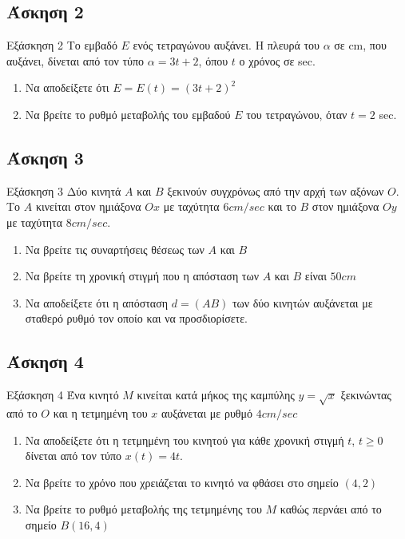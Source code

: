 \documentclass[greek]{beamer}
\begin{document}
\subsection{Άσκηση 2}
\begin{frame}[label=Άσκηση2]{Εξάσκηση 2}
 Το εμβαδό $Ε$ ενός τετραγώνου αυξάνει. Η πλευρά του $α$ σε cm, που αυξάνει, δίνεται από τον τύπο $α=3t+2$, όπου $t$ ο χρόνος σε sec.
 \begin{enumerate}
  \item<1-> Να αποδείξετε ότι $Ε=Ε(t)=(3t+2)^2$
  \item<2-> Να βρείτε το ρυθμό μεταβολής του εμβαδού $Ε$ του τετραγώνου, όταν $t=2$ sec.
 \end{enumerate}

\end{frame}

\subsection{Άσκηση 3}
\begin{frame}[label=Άσκηση3]{Εξάσκηση 3}
 Δύο κινητά $Α$ και $Β$ ξεκινούν συγχρόνως από την αρχή των αξόνων $Ο$. Το $Α$ κινείται στον ημιάξονα $Οx$ με ταχύτητα $6cm/sec$ και το $Β$ στον ημιάξονα $Οy$ με ταχύτητα $8cm/sec$.
 \begin{enumerate}
  \item<1-> Να βρείτε τις συναρτήσεις θέσεως των $Α$ και $Β$
  \item<2-> Να βρείτε τη χρονική στιγμή που η απόσταση των $Α$ και $Β$ είναι $50cm$
  \item<3-> Να αποδείξετε ότι η απόσταση $d=(ΑΒ)$ των δύο κινητών αυξάνεται με σταθερό ρυθμό τον οποίο και να προσδιορίσετε.
 \end{enumerate}

\end{frame}

\subsection{Άσκηση 4}
\begin{frame}[label=Άσκηση4]{Εξάσκηση 4}
 Ένα κινητό $Μ$ κινείται κατά μήκος της καμπύλης $y=\sqrt{x}$ ξεκινώντας από το $Ο$ και η τετμημένη του $x$ αυξάνεται με ρυθμό $4cm/sec$
 \begin{enumerate}
  \item<1-> Να αποδείξετε ότι η τετμημένη του κινητού για κάθε χρονική στιγμή $t$, $t\ge 0$ δίνεται από τον τύπο $x(t)=4t$.
  \item<2-> Να βρείτε το χρόνο που χρειάζεται το κινητό να φθάσει στο σημείο $(4,2)$
  \item<3-> Να βρείτε το ρυθμό μεταβολής της τετμημένης του $Μ$ καθώς περνάει από το σημείο $Β(16,4)$
 \end{enumerate}

\end{frame}
\end{document}
